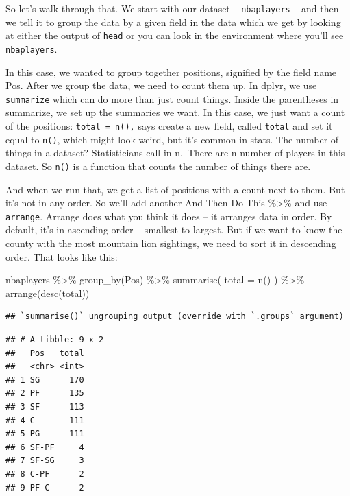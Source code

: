 \documentclass[
]{book}
\newenvironment{Shaded}{\begin{snugshade}}{\end{snugshade}}
\newcommand{\AttributeTok}[1]{\textcolor[rgb]{0.77,0.63,0.00}{#1}}
\newcommand{\FunctionTok}[1]{\textcolor[rgb]{0.00,0.00,0.00}{#1}}
\newcommand{\NormalTok}[1]{#1}
\newcommand{\SpecialCharTok}[1]{\textcolor[rgb]{0.00,0.00,0.00}{#1}}
\begin{document}
So let's walk through that. We start with our dataset -- \texttt{nbaplayers} -- and then we tell it to group the data by a given field in the data which we get by looking at either the output of \texttt{head} or you can look in the environment where you'll see \texttt{nbaplayers}.

In this case, we wanted to group together positions, signified by the field name Pos. After we group the data, we need to count them up. In dplyr, we use \texttt{summarize} \href{http://dplyr.tidyverse.org/reference/summarise.html}{which can do more than just count things}. Inside the parentheses in summarize, we set up the summaries we want. In this case, we just want a count of the positions: \texttt{total\ =\ n(),} says create a new field, called \texttt{total} and set it equal to \texttt{n()}, which might look weird, but it's common in stats. The number of things in a dataset? Statisticians call in n.~There are n number of players in this dataset. So \texttt{n()} is a function that counts the number of things there are.

And when we run that, we get a list of positions with a count next to them. But it's not in any order. So we'll add another And Then Do This \%\textgreater\% and use \texttt{arrange}. Arrange does what you think it does -- it arranges data in order. By default, it's in ascending order -- smallest to largest. But if we want to know the county with the most mountain lion sightings, we need to sort it in descending order. That looks like this:

\begin{Shaded}
\begin{Highlighting}[]
\NormalTok{nbaplayers }\SpecialCharTok{\%\textgreater{}\%}
  \FunctionTok{group\_by}\NormalTok{(Pos) }\SpecialCharTok{\%\textgreater{}\%}
  \FunctionTok{summarise}\NormalTok{(}
    \AttributeTok{total =} \FunctionTok{n}\NormalTok{()}
\NormalTok{  ) }\SpecialCharTok{\%\textgreater{}\%} \FunctionTok{arrange}\NormalTok{(}\FunctionTok{desc}\NormalTok{(total))}
\end{Highlighting}
\end{Shaded}

\begin{verbatim}
## `summarise()` ungrouping output (override with `.groups` argument)
\end{verbatim}

\begin{verbatim}
## # A tibble: 9 x 2
##   Pos   total
##   <chr> <int>
## 1 SG      170
## 2 PF      135
## 3 SF      113
## 4 C       111
## 5 PG      111
## 6 SF-PF     4
## 7 SF-SG     3
## 8 C-PF      2
## 9 PF-C      2
\end{verbatim}
\end{document}
